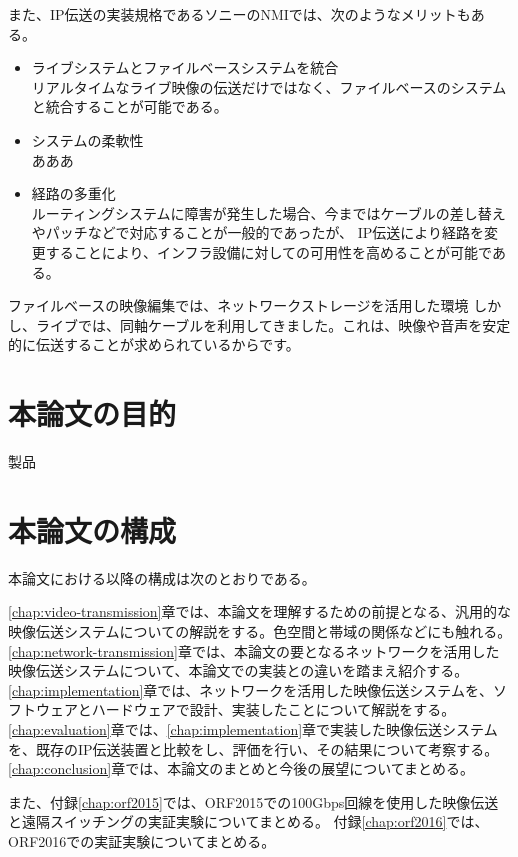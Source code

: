 \newpage
また、IP伝送の実装規格であるソニーのNMI\cite{sony-nmi}では、次のようなメリットもある。

\begin{itemize}
  \item ライブシステムとファイルベースシステムを統合\mbox{}\\
    リアルタイムなライブ映像の伝送だけではなく、ファイルベースのシステムと統合することが可能である。
  \item システムの柔軟性\mbox{}\\
    あああ
  \item 経路の多重化\mbox{}\\
    ルーティングシステムに障害が発生した場合、今まではケーブルの差し替えやパッチなどで対応することが一般的であったが、
    IP伝送により経路を変更することにより、インフラ設備に対しての可用性を高めることが可能である。
\end{itemize}

ファイルベースの映像編集では、ネットワークストレージを活用した環境
しかし、ライブでは、同軸ケーブルを利用してきました。これは、映像や音声を安定的に伝送することが求められているからです。


\section{本論文の目的}
製品
%
%

\section{本論文の構成}
本論文における以降の構成は次のとおりである。

\ref{chap:video-transmission}章では、本論文を理解するための前提となる、汎用的な映像伝送システムについての解説をする。色空間と帯域の関係などにも触れる。
\ref{chap:network-transmission}章では、本論文の要となるネットワークを活用した映像伝送システムについて、本論文での実装との違いを踏まえ紹介する。
\ref{chap:implementation}章では、ネットワークを活用した映像伝送システムを、ソフトウェアとハードウェアで設計、実装したことについて解説をする。
\ref{chap:evaluation}章では、\ref{chap:implementation}章で実装した映像伝送システムを、既存のIP伝送装置と比較をし、評価を行い、その結果について考察する。
\ref{chap:conclusion}章では、本論文のまとめと今後の展望についてまとめる。

また、付録\ref{chap:orf2015}では、ORF2015での100Gbps回線を使用した映像伝送と遠隔スイッチングの実証実験についてまとめる。
付録\ref{chap:orf2016}では、ORF2016での実証実験についてまとめる。

